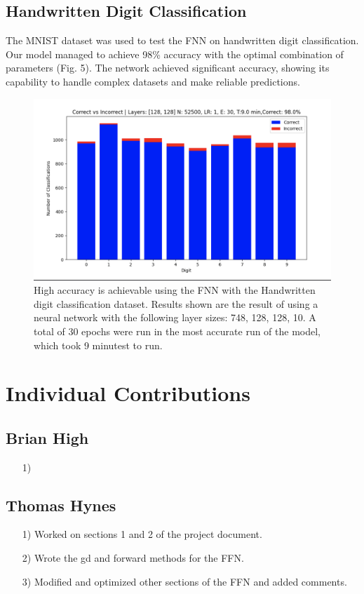 \documentclass{article}
\begin{document}
\subsection{Handwritten Digit Classification}

The MNIST dataset was used to test the FNN on handwritten digit classification. Our model managed to achieve 98\% accuracy with the optimal combination of parameters (Fig. 5).  The network achieved significant accuracy, showing its capability to handle complex datasets and make reliable predictions.

\begin{figure}
    \centering
    \includegraphics[width=0.5\linewidth]{image.png}
    \caption{High accuracy is achievable using the FNN with the Handwritten digit classification dataset. Results shown are the result of using a neural network with the following layer sizes: 748, 128, 128, 10. A total of 30 epochs were run in the most accurate run of the model, which took 9 minutest to run.}
\end{figure}

\section{Individual Contributions}

\subsection{Brian High}
\begin{itemize}
    \item[1)] 
\end{itemize}

\subsection{Thomas Hynes}
\begin{itemize}
    \item[1)] Worked on sections 1 and 2 of the project document.
    \item[2)] Wrote the gd and forward methods for the FFN.
    \item[3)] Modified and optimized other sections of the FFN and added comments.
\end{itemize}
\end{document}
